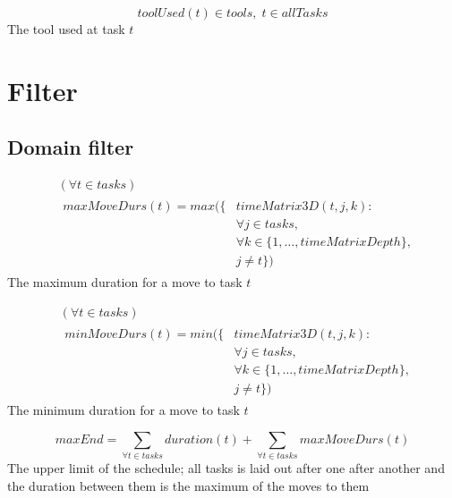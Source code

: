 \documentclass[10pt,a4paper]{report}
\begin{document}
\begin{equation}\label{eq:52}
toolUsed(t) \in tools, \; t \in allTasks\end{equation}
The tool used at task $t$


\section{Filter}
\subsection{Domain filter}

\begin{equation}
\begin{aligned}\label{eq:57}
&( \forall t \in tasks)\\
&\begin{aligned}
maxMoveDurs(t) = max(\{&timeMatrix3D(t,j,k) :\\
&\forall j \in tasks, \\
&\forall k \in \{1 , \ldots , timeMatrixDepth\},\\
&j \neq t\})
\end{aligned}
\end{aligned}
\end{equation}
The maximum duration for a move to task $t$


\begin{equation}
\begin{aligned}\label{eq:58}
&(\forall t \in tasks)\\
&\begin{aligned}
minMoveDurs(t) = min(\{&timeMatrix3D(t,j,k) :\\
&\forall j \in tasks, \\
&\forall k \in \{1 , \ldots , timeMatrixDepth\},\\
&j \neq t\})
\end{aligned}
\end{aligned}
\end{equation}
The minimum duration for a move to task $t$

\begin{equation}\label{eq:59}
maxEnd = \sum_{\forall t \in tasks} duration(t) + \sum_{\forall t \in tasks} maxMoveDurs(t)
\end{equation}
The upper limit of the schedule; all tasks is laid out after one after another and the duration between them is the maximum of the moves to them
\end{document}
